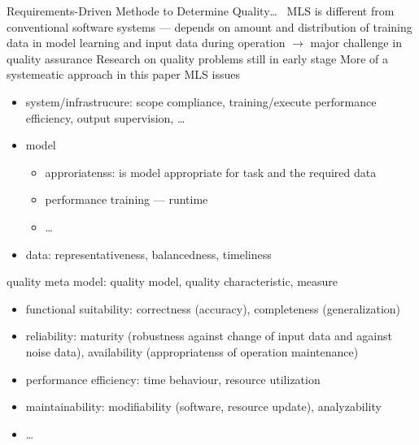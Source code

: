 Requirements-Driven Methode to Determine Quality\ldots~\cite{nakamichi_requirements-driven_2020}
MLS is different from conventional software systems --- depends on amount and distribution of
training data in model learning and input data during operation $\rightarrow$ major challenge in
quality assurance
Research on quality problems still in early stage
More of a systemeatic approach in this paper
MLS issues
\begin{itemize}
    \item system/infrastrucure: scope compliance, training/execute performance efficiency, output
        supervision, \ldots
    \item model
        \begin{itemize}
            \item approriatenss: is model appropriate for task and the required data
            \item performance training --- runtime
            \item \ldots
        \end{itemize}
    \item data: representativeness, balancedness, timeliness
\end{itemize}
quality meta model: quality model, quality characteristic, measure
\begin{itemize}
    \item functional suitability: correctness (accuracy), completeness (generalization)
    \item reliability: maturity (robustness against change of input data and against noise data),
        availability (appropriatenss of operation maintenance)
    \item performance efficiency: time behaviour, resource utilization
    \item maintainability: modifiability (software, resource update), analyzability
    \item \ldots
\end{itemize}
